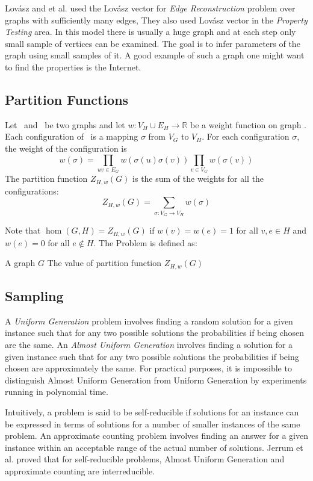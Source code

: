 Lov\'{a}sz and et al. \cite{propertytesting} used the Lov\'{a}sz vector
for \emph{Edge Reconstruction} problem over graphs with sufficiently many edges, 
They also used Lov\'{a}sz vector in the {\em Property Testing} area.
In this model there is usually a huge graph and at each step only small sample of vertices
can be examined. The goal is to infer parameters of the graph using small samples of it. 
A good example of such a graph one might want to find the properties is the Internet.


\subsection*{Partition Functions}
Let \mG\ and \mH\ be two graphs and let \(w: V_H \cup E_H\to \mathbb{R}\) be a weight function
on graph \mH. Each configuration of \mG\ is a mapping \(\sigma\) from \(V_G\) to
\(V_H\). For each configuration \(\sigma\), the weight of the configuration is
\[w(\sigma)=\prod_{uv\in E_G}w(\sigma(u)\sigma(v))\prod_{v\in V_G}w(\sigma(v))\]
The partition function \(Z_{H,w}(G)\) is the sum of the weights for all the configurations:
\[Z_{H,w}(G)=\sum_{\sigma:V_G\to V_H}w(\sigma)\]

Note that \(\hom(G,H)=Z_{H,w}(G)\) if \(w(v)=w(e)=1\) for all \(v,e\in H\)
and \(w(e)=0\) for all \(e\not\in H\)\@. 
The  Problem is defined as:

\pnndef%
{A graph \(G\)}
{The value of partition function \(Z_{H,w}(G)\)}

\subsection*{Sampling}
A \emph{Uniform Generation} problem involves finding a
random solution for a given instance such that for any two possible solutions
the probabilities if being chosen are the same.
An \emph{Almost Uniform Generation} involves finding 
a solution for a given instance such that
for any two possible solutions the probabilities if being chosen are approximately the same.
For practical purposes, it is impossible to distinguish
Almost Uniform Generation from Uniform Generation by experiments running in polynomial time.

Intuitively, a problem is said to be self-reducible if solutions for an instance can be
expressed in terms of solutions for a number of smaller instances of the same problem.
An approximate counting problem involves finding an answer for a given
instance within an acceptable range of the actual number of solutions.
Jerrum et al. \cite{JVV} proved that 
for self-reducible problems, Almost Uniform Generation and approximate counting 
are interreducible.

